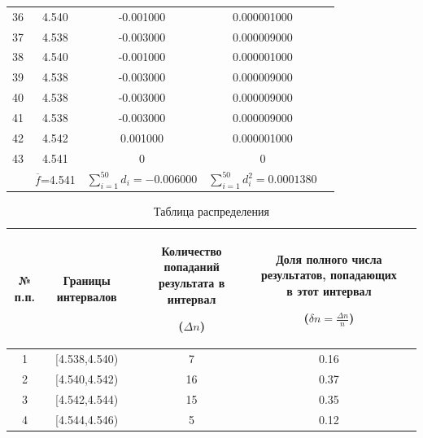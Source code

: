 \begin{center}
\begin{tabular}{|c|c|c|c|c|}
36 &	4.540  &  -0.001000  &  0.000001000 \\
37 &	4.538  &  -0.003000  &  0.000009000 \\
38 &	4.540  &  -0.001000  &  0.000001000 \\
39 &	4.538  &  -0.003000  &  0.000009000 \\
40 &	4.538  &  -0.003000  &  0.000009000 \\
41 &	4.538  &  -0.003000  &  0.000009000 \\
42 &	4.542  &   0.001000  &  0.000001000 \\
43 &	4.541  &   0         &  0           \\
\hline
   & $\overline{f}$=4.541 & $\sum_{i=1}^{50} d_i= -0.006000$ & $\sum_{i=1}^{50}d_i^2=0.0001380$\\
\hline
\end{tabular}
\end{center}

\begin{center}
\begin{table}[h!]
\centering
\caption{Таблица распределения}
\label{tabl:3}
\begin{tabular}{|c|c|c|c|c|}
\hline
\begin{minipage}{1cm}
    № п.п.
\end{minipage}&
\begin{minipage}{5cm}
\begin{center}
    Границы интервалов
\end{center}
\end{minipage} &
\begin{minipage}{5cm}
\begin{center}
    Количество попаданий результата в интервал

    ($\Delta n$)
\end{center}
\end{minipage} &
\begin{minipage}{5cm}
\begin{center}
    Доля полного числа результатов, попадающих в этот интервал
    
    ($\delta n=\frac{\Delta n}{n}$)
\end{center}
\end{minipage}\\
\hline
1 &  [4.538,4.540)  &  7   &  0.16  \\
2 &  [4.540,4.542)  &  16  &  0.37  \\
3 &  [4.542,4.544)  &  15  &  0.35  \\
4 &  [4.544,4.546)  &  5   &  0.12  \\
\hline
\end{tabular}
\end{table}
\end{center}

